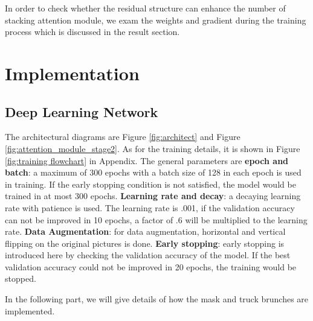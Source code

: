 \documentclass{article}
\begin{document}
\begin{multicols}{2}
In order to check whether the residual structure can enhance the number of stacking attention module, we exam the weights and gradient during the training process which is discussed in the result section. 





\section{Implementation}

\subsection{Deep Learning Network}
The architectural diagrams are Figure \ref{fig:architect} and Figure \ref{fig:attention_module_stage2}. 
As for the training details, it is shown in Figure \ref{fig:training flowchart} in Appendix. The general parameters are \textbf{epoch and batch}: a maximum of 300 epochs with a batch size of 128 in each epoch is used in training. If the early stopping condition is not satisfied, the model would be trained in at most 300 epochs. \textbf{Learning rate and decay}: a decaying learning rate with patience is used. The learning rate is .001, if the validation accuracy can not be improved in 10 epochs, a factor of .6 will be multiplied to the learning rate. \textbf{Data Augmentation}: for data augmentation, horizontal and vertical flipping on the original pictures is done.
\textbf{Early stopping}: early stopping is introduced here by checking the validation accuracy of the model. If the best validation accuracy could not be improved in 20 epochs, the training would be stopped.



In the following part, we will give details of how the mask and truck brunches are implemented. 


\end{multicols}
\end{document}
